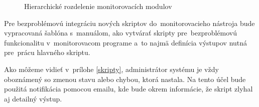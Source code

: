 \begin{figure}[H]
	\begin{center}
		\vspace{-2em}
		\caption{Hierarchické rozdelenie monitorovacích modulov}
		\label{script_classes}
	\end{center}
\end{figure}

Pre bezproblémovú integráciu nových skriptov do~monitorovacieho nástroja bude vypracovaná šablóna s~manuálom, ako vytvárať skripty pre~bezproblémovú funkcionalitu v~monitorovacom programe a~to najmä definícia výstupov nutná pre~prácu hlavného skriptu.

Ako môžeme vidieť v~prílohe \ref{skripty}, administrátor systému je vždy oboznámený so zmenou stavu alebo chybou, ktorá nastala. Na tento účel bude použitá notifikácia pomocou \mbox{emailu}, kde bude okrem informácie, že skript zlyhal aj detailný výstup.

